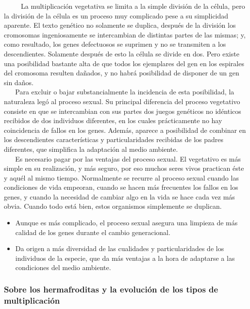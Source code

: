 ~ ~ ~ La multiplicación vegetativa se limita a la simple división de la
célula, pero la división de la célula es un proceso muy complicado pese
a su simplicidad aparente. El texto genético no solamente se duplica,
después de la división los cromosomas ingeniosamente se intercambian de
distintas partes de las mismas; y, como resultado, los genes defectuosos
se suprimen y no se transmiten a los descendientes. Solamente después de
esto la célula se divide en dos. Pero existe una posibilidad bastante
alta de que todos los ejemplares del gen en los espirales del cromosoma
resulten dañados, y no habrá posibilidad de disponer de un gen sin
daños.\\
\hspace*{0.333em} ~ ~ Para excluir o bajar substancialmente la
incidencia de esta posibilidad, la naturaleza legó al proceso sexual. Su
principal diferencia del proceso vegetativo consiste en que se
intercambian con sus partes dos juegos genéticos no idénticos recibidos
de dos individuos diferentes, en los cuales prácticamente no hay
coincidencia de fallos en los genes. Además, aparece a posibilidad de
combinar en los descendientes características y particularidades
recibidas de los padres diferentes, que simplifica la adaptación al
medio ambiente.\\
\hspace*{0.333em} ~ ~ Es necesario pagar por las ventajas del proceso
sexual. El vegetativo es más simple en su realización, y más seguro, por
eso muchos seres vivos practican éste y aquél al mismo tiempo.
Normalmente se recurre al proceso sexual cuando las condiciones de vida
empeoran, cuando se hacen más frecuentes los fallos en los genes, y
cuando la necesidad de cambiar algo en la vida se hace cada vez más
obvia. Cuando todo está bien, estos organismos simplemente se duplican.

\begin{itemize}
\item
  Aunque es más complicado, el proceso sexual asegura una limpieza de
  más calidad de los genes durante el cambio generacional.
\item
  Da origen a más diversidad de las cualidades y particularidades de los
  individuos de la especie, que da más ventajas a la hora de adaptarse a
  las condiciones del medio ambiente.
\end{itemize}

\vfill

\subsubsection{Sobre los hermafroditas y la evolución de los tipos de multiplicación}\label{sobre-los-hermafroditas-y-la-evoluciuxf3n-de-los-tipos-de-multiplicaciuxf3n}

